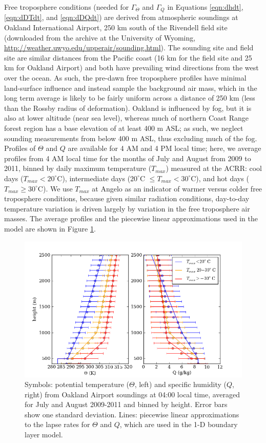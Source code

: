 Free troposphere conditions (needed for $\Gamma_{\Theta}$ and $\Gamma_Q$ in Equations \ref{eqn:dhdt}, \ref{eqn:dDTdt}, and \ref{eqn:dDQdt}) are derived from atmospheric soundings at Oakland International Airport, 250 km south of the Rivendell field site (downloaded from the archive at the University of Wyoming, \url{http://weather.uwyo.edu/upperair/sounding.html}).  The sounding site and field site are similar distances from the Pacific coast (16 km for the field site and 25 km for Oakland Airport) and both have prevailing wind directions from the west over the ocean.  As such, the pre-dawn free troposphere profiles have minimal land-surface influence and instead sample the background air mass, which in the long term average is likely to be fairly uniform across a distance of 250 km (less than the Rossby radius of deformation).  Oakland is influenced by fog, but it is also at lower altitude (near sea level), whereas much of northern Coast Range forest region has a base elevation of at least 400 m ASL; as such, we neglect sounding measurements from below 400 m ASL, thus excluding much of the fog.  Profiles of $\Theta$ and $Q$ are available for 4 AM and 4 PM local time; here, we average profiles from 4 AM local time for the months of July and August from 2009 to 2011, binned by daily maximum temperature ($T_{max}$) measured at the ACRR: cool days ($T_{max} < 20^{\circ}$C), intermediate days ($20^{\circ}$C $\le T_{max} < 30^{\circ}$C), and hot days ($T_{max} \ge 30^{\circ}$C).  We use $T_{max}$ at Angelo as an indicator of warmer versus colder free troposphere conditions, because given similar radiation conditions, day-to-day temperature variation is driven largely by variation in the free troposphere air masses.  The average profiles and the piecewise linear approximations used in the model are shown in Figure \ref{fig:BL_LapseRates}.

\begin{figure}[here]
\includegraphics[width=1\textwidth]{ch2-BL/figures/fitted_lapserates_theta_Q_onefig.png}
\caption{Symbols: potential temperature ($\Theta$, left) and specific humidity ($Q$, right) from Oakland Airport soundings at 04:00 local time, averaged for July and August 2009-2011 and binned by height.  Error bars show one standard deviation.  Lines: piecewise linear approximations to the lapse rates for $\Theta$ and $Q$, which are used in the 1-D boundary layer model.}
\label{fig:BL_LapseRates}
\end{figure}

